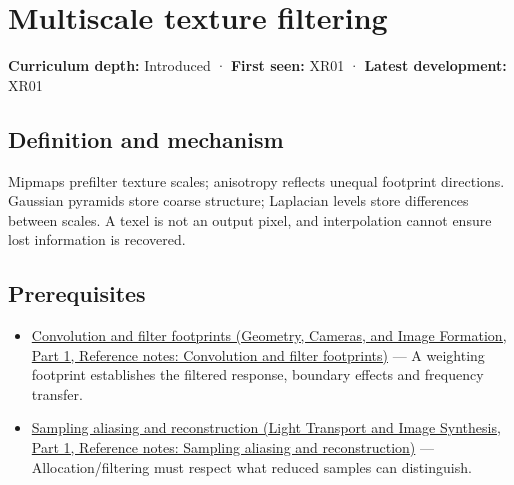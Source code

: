 \hypertarget{appendix-b677a85ba76f}{}\label{referencestart:appendix-b677a85ba76f}
\section{Multiscale texture filtering}\label{appendix-b677a85ba76f-multiscale-texture-filtering}

\hypertarget{appendix-b677a85ba76f-multiscale-texture-filtering}{}

\textbf{Curriculum depth:} Introduced · \textbf{First seen:} XR01 · \textbf{Latest development:} XR01

\begin{allmightroledefinition}

\subsection{Definition and mechanism}\label{appendix-b677a85ba76f-definition-and-mechanism}

\hypertarget{appendix-b677a85ba76f-definition-and-mechanism}{}

Mipmaps prefilter texture scales; anisotropy reflects unequal footprint directions. Gaussian pyramids store coarse structure; Laplacian levels store differences between scales. A texel is not an output pixel, and interpolation cannot ensure lost information is recovered.

\end{allmightroledefinition}

\subsection{Prerequisites}\label{appendix-b677a85ba76f-prerequisites}

\hypertarget{appendix-b677a85ba76f-prerequisites}{}

\begin{itemize}
\tightlist
\item
  \href{../03-Geometry-Cameras-and-Image-Formation-P01/main.pdf\#nameddest=appendix-d5b3c692d9f0}{Convolution and filter footprints (Geometry, Cameras, and Image Formation, Part 1, Reference notes: Convolution and filter footprints)} --- A weighting footprint establishes the filtered response, boundary effects and frequency transfer.
\item
  \href{../04-Light-Transport-and-Image-Synthesis-P01/main.pdf\#nameddest=appendix-6a7869dd79a6}{Sampling aliasing and reconstruction (Light Transport and Image Synthesis, Part 1, Reference notes: Sampling aliasing and reconstruction)} --- Allocation/filtering must respect what reduced samples can distinguish.
\end{itemize}

